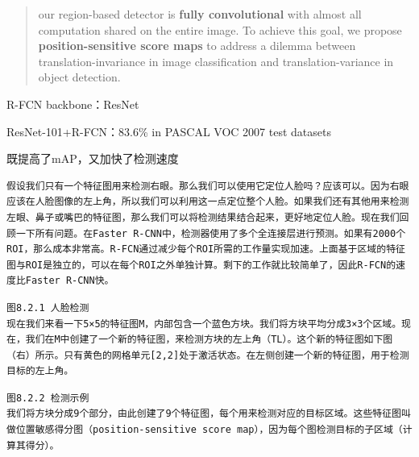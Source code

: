 \begin{quote}
our region-based detector is \textbf{fully convolutional} with almost
all computation shared on the entire image. To achieve this goal, we
propose \textbf{position-sensitive score maps} to address a dilemma
between translation-invariance in image classification and
translation-variance in object detection.
\end{quote}

R-FCN backbone：ResNet

ResNet-101+R-FCN：83.6\% in PASCAL VOC 2007 test datasets

既提高了mAP，又加快了检测速度

\begin{verbatim}
假设我们只有一个特征图用来检测右眼。那么我们可以使用它定位人脸吗？应该可以。因为右眼应该在人脸图像的左上角，所以我们可以利用这一点定位整个人脸。如果我们还有其他用来检测左眼、鼻子或嘴巴的特征图，那么我们可以将检测结果结合起来，更好地定位人脸。现在我们回顾一下所有问题。在Faster R-CNN中，检测器使用了多个全连接层进行预测。如果有2000个ROI，那么成本非常高。R-FCN通过减少每个ROI所需的工作量实现加速。上面基于区域的特征图与ROI是独立的，可以在每个ROI之外单独计算。剩下的工作就比较简单了，因此R-FCN的速度比Faster R-CNN快。
\end{verbatim}

\begin{figure}
\centering
\caption{}
\end{figure}

\begin{verbatim}
图8.2.1 人脸检测
现在我们来看一下5×5的特征图M，内部包含一个蓝色方块。我们将方块平均分成3×3个区域。现在，我们在M中创建了一个新的特征图，来检测方块的左上角（TL）。这个新的特征图如下图（右）所示。只有黄色的网格单元[2,2]处于激活状态。在左侧创建一个新的特征图，用于检测目标的左上角。
\end{verbatim}

\begin{figure}
\centering
\caption{}
\end{figure}

\begin{verbatim}
图8.2.2 检测示例
我们将方块分成9个部分，由此创建了9个特征图，每个用来检测对应的目标区域。这些特征图叫做位置敏感得分图（position-sensitive score map），因为每个图检测目标的子区域（计算其得分）。
\end{verbatim}

\begin{figure}
\centering
\caption{}
\end{figure}

